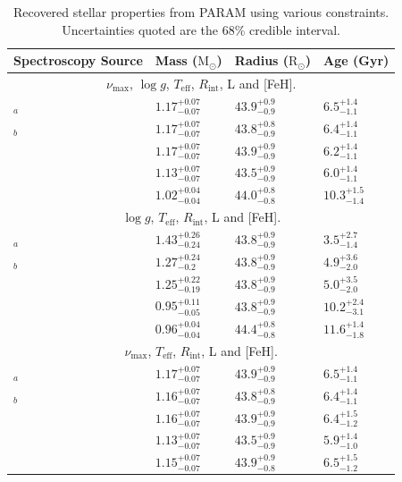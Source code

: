 \documentclass[modern]{aastex61}
\begin{document}
\begin{table}
	\centering

	\caption{Recovered stellar properties from \textsc{PARAM} using various constraints. Uncertainties quoted are the 68\% credible interval.}
	\label{tab:res_mass}
	\begin{tabular}{llll} %
		\hline
		Spectroscopy Source & Mass ($\textrm{M}_{\odot}$) & Radius ($\textrm{R}_{\odot}$) & Age (Gyr)\\
		\hline
		\multicolumn{4}{c}{$\nu_{\textrm{max}}$, $\log{g}$, $T_{\textrm{eff}}$, $R_\textrm{int}$, L and [FeH].} \\
		\hline
		\cite{2012Sheffield}$_{a}$ &$1.17^{+0.07}_{-0.07}$&$43.9^{+0.9}_{-0.9}$&$6.5^{+1.4}_{-1.1}$\\
		\cite{2012Sheffield}$_{b}$&$1.17^{+0.07}_{-0.07}$&$43.8^{+0.8}_{-0.9}$&$6.4^{+1.4}_{-1.1}$\\
		\cite{2011Prugniel}&$1.17^{+0.07}_{-0.07}$&$43.9^{+0.9}_{-0.9}$&$6.2^{+1.4}_{-1.1}$\\
		\cite{2008Massarotti}&$1.13^{+0.07}_{-0.07}$&$43.5^{+0.9}_{-0.9}$&$6.0^{+1.4}_{-1.1}$\\
		\cite{2009Frasca}&$1.02^{+0.04}_{-0.04}$&$44.0^{+0.8}_{-0.8}$&$10.3^{+1.5}_{-1.4}$\\
		\hline
		\multicolumn{4}{c}{$\log{g}$, $T_{\textrm{eff}}$, $R_\textrm{int}$, L and [FeH].} \\
		\hline
\cite{2012Sheffield}$_{a}$&$1.43^{+0.26}_{-0.24}$&$43.8^{+0.9}_{-0.9}$&$3.5^{+2.7}_{-1.4}$\\
\cite{2012Sheffield}$_{b}$&$1.27^{+0.24}_{-0.2}$&$43.8^{+0.9}_{-0.9}$&$4.9^{+3.6}_{-2.0}$\\
\cite{2011Prugniel}&$1.25^{+0.22}_{-0.19}$&$43.8^{+0.9}_{-0.9}$&$5.0^{+3.5}_{-2.0}$\\
\cite{2008Massarotti}&$0.95^{+0.11}_{-0.05}$&$43.8^{+0.9}_{-0.9}$&$10.2^{+2.4}_{-3.1}$\\
\cite{2009Frasca}&$0.96^{+0.04}_{-0.04}$&$44.4^{+0.8}_{-0.8}$&$11.6^{+1.4}_{-1.8}$\\
		\hline
		\multicolumn{4}{c}{$\nu_{\textrm{max}}$, $T_{\textrm{eff}}$, $R_\textrm{int}$, L and [FeH].} \\
		\hline
\cite{2012Sheffield}$_{a}$&$1.17^{+0.07}_{-0.07}$&$43.9^{+0.9}_{-0.9}$&$6.5^{+1.4}_{-1.1}$\\
\cite{2012Sheffield}$_{b}$&$1.16^{+0.07}_{-0.07}$&$43.8^{+0.8}_{-0.9}$&$6.4^{+1.4}_{-1.1}$\\
\cite{2011Prugniel}&$1.16^{+0.07}_{-0.07}$&$43.9^{+0.9}_{-0.9}$&$6.4^{+1.5}_{-1.2}$\\
\cite{2008Massarotti}&$1.13^{+0.07}_{-0.07}$&$43.5^{+0.9}_{-0.9}$&$5.9^{+1.4}_{-1.0}$\\
\cite{2009Frasca}&$1.15^{+0.07}_{-0.07}$&$43.9^{+0.9}_{-0.8}$&$6.5^{+1.5}_{-1.2}$\\
		\hline
	\end{tabular}

\end{table}
\end{document}
